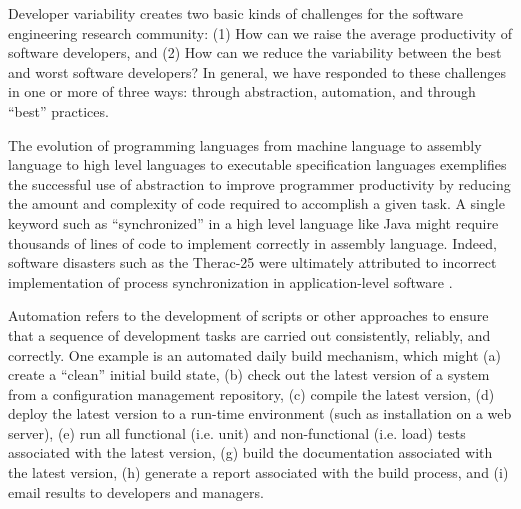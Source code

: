 
Developer variability creates two basic kinds of challenges for the
software engineering research community: (1) How can we raise the average
productivity of software developers, and (2) How can we reduce the
variability between the best and worst software developers?  In general, we
have responded to these challenges in one or more of three ways: through
abstraction, automation, and through ``best'' practices.

The evolution of programming languages from machine language to assembly
language to high level languages to executable specification languages
exemplifies the successful use of abstraction to improve programmer
productivity by reducing the amount and complexity of code required to
accomplish a given task.  A single keyword such as ``synchronized'' in a
high level language like Java might require thousands of lines of code to
implement correctly in assembly language.  Indeed, software disasters such
as the Therac-25 were ultimately attributed to incorrect implementation of
process synchronization in application-level software \cite{Leveson93}.

Automation refers to the development of scripts or other approaches to
ensure that a sequence of development tasks are carried out consistently,
reliably, and correctly.  One example is an automated daily build
mechanism, which might (a) create a ``clean'' initial build state, (b)
check out the latest version of a system from a configuration management
repository, (c) compile the latest version, (d) deploy the latest version
to a run-time environment (such as installation on a web server), (e) run
all functional (i.e. unit) and non-functional (i.e. load) tests associated
with the latest version, (g) build the documentation associated with the
latest version, (h) generate a report associated with the build process,
and (i) email results to developers and managers.  

